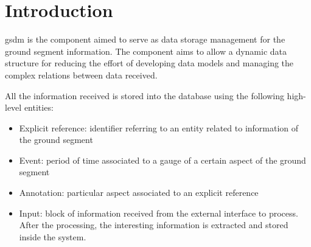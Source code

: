 \chapter{Introduction}\label{c:intro}

\acrshort{gsdm} is the component aimed to serve as data storage management for the ground segment information. The component aims to allow a dynamic data structure for reducing the effort of developing data models and managing the complex relations between data received.

All the information received is stored into the database using the following high-level entities:

\begin{itemize}

\item Explicit reference: identifier referring to an entity related to information of the ground segment
\item Event: period of time associated to a gauge of a certain aspect of the ground segment
\item Annotation: particular aspect associated to an explicit reference
\item Input: block of information received from the external interface to process. After the processing, the interesting information is extracted and stored inside the system.

\end{itemize}